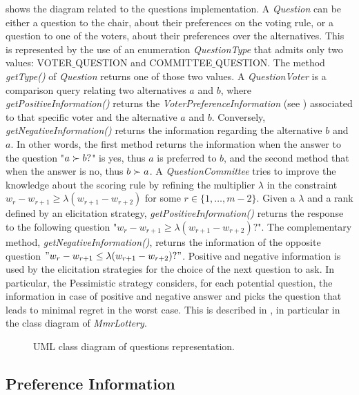  shows the diagram related to the questions implementation. A \textit{Question} can be either a question to the chair, about their preferences on the voting rule, or a question to one of the voters, about their preferences over the alternatives. This is represented by the use of an enumeration \textit{QuestionType} that admits only two values: VOTER$\_$QUESTION and COMMITTEE$\_\allowbreak$QUESTION.
The method \textit{getType()} of \textit{Question} returns one of those two values.
A \textit{QuestionVoter} is a comparison query relating two alternatives $a$ and $b$, where \textit{getPositiveInformation()} returns the \textit{VoterPreferenceInformation} (see ) associated to that specific voter and the alternative $a$ and $b$. Conversely, \textit{getNegativeInformation()} returns the information regarding the alternative $b$ and $a$. In other words, the first method returns the information when the answer to the question "$a\succ b ?$" is yes, thus $a$ is preferred to $b$, and the second method that when the answer is no, thus $b\succ a$.
A \textit{QuestionCommittee} tries to improve the knowledge about the scoring rule by refining the multiplier $\lambda$ in the constraint $w_{r} - w_{r+1} \geq \lambda (w_{r+1} - w_{r+2})$ for some $r \in \{1,\ldots,m-2\}$. Given a $\lambda$ and a rank defined by an elicitation strategy, \textit{getPositiveInformation()} returns the response to the following question "$w_{r} - w_{r+1} \geq \lambda (w_{r+1} - w_{r+2})?$". The complementary method, \textit{getNegativeInformation()}, returns the information of the opposite question $"w_{r} - w_{r+1} \leq \lambda (w_{r+1} - w_{r+2})?"$.
Positive and negative information is used by the elicitation strategies for the choice of the next question to ask. In particular, the Pessimistic strategy considers, for each potential question, the information in case of positive and negative answer and picks the question that leads to minimal regret in the worst case. This is described in , in particular in the class diagram of \textit{MmrLottery}.


\begin{figure}
	\centering
	
	\caption{UML class diagram of questions representation.}
	\label{uml:questions}
\end{figure}

\subsection{Preference Information}

